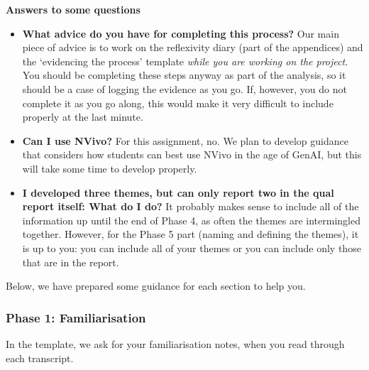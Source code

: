\documentclass[
  english,
  letterpaper,
  DIV=11,
  numbers=noendperiod]{scrreprt}
\providecommand{\tightlist}{%
  \setlength{\itemsep}{0pt}\setlength{\parskip}{0pt}}
\begin{document}
\textbf{Answers to some questions}

\begin{itemize}
\tightlist
\item
  \textbf{What advice do you have for completing this process?} Our main
  piece of advice is to work on the reflexivity diary (part of the
  appendices) and the `evidencing the process' template \emph{while you
  are working on the project}. You should be completing these steps
  anyway as part of the analysis, so it should be a case of logging the
  evidence as you go. If, however, you do not complete it as you go
  along, this would make it very difficult to include properly at the
  last minute.
\item
  \textbf{Can I use NVivo?} For this assignment, no. We plan to develop
  guidance that considers how students can best use NVivo in the age of
  GenAI, but this will take some time to develop properly.
\item
  \textbf{I developed three themes, but can only report two in the qual
  report itself: What do I do?} It probably makes sense to include all
  of the information up until the end of Phase 4, as often the themes
  are intermingled together. However, for the Phase 5 part (naming and
  defining the themes), it is up to you: you can include all of your
  themes or you can include only those that are in the report.
\end{itemize}

Below, we have prepared some guidance for each section to help you.

\subsubsection{Phase 1: Familiarisation}\label{phase-1-familiarisation}

\begin{tcolorbox}[enhanced jigsaw, breakable, bottomtitle=1mm, leftrule=.75mm, opacityback=0, colbacktitle=quarto-callout-important-color!10!white, opacitybacktitle=0.6, toprule=.15mm, colback=white, left=2mm, coltitle=black, bottomrule=.15mm, titlerule=0mm, title=\textcolor{quarto-callout-important-color}{\faExclamation}\hspace{0.5em}{Phase 1: What is asked for?}, toptitle=1mm, colframe=quarto-callout-important-color-frame, arc=.35mm, rightrule=.15mm]

In the template, we ask for your familiarisation notes, when you read
through each transcript.

\end{tcolorbox}
\end{document}
